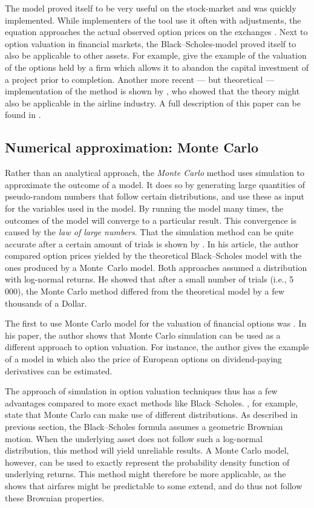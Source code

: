 The model proved itself to be very useful on the stock-market and was quickly implemented. While implementers of the tool use it often with adjustments, the equation approaches the actual observed option prices on the exchanges \cite{bodie2008investments}. 
Next to option valuation in financial markets, the Black--Scholes-model proved itself to also be applicable to other assets. For example,  give the example of the valuation of the options held by a firm which allows it to abandon the capital investment of a project prior to completion. Another more recent --- but theoretical --- implementation of the method is shown by , who showed that the theory might also be applicable in the airline industry. A full description of this paper can be found in .


\subsection{Numerical approximation: Monte Carlo}
Rather than an analytical approach, the \emph{Monte Carlo} method uses simulation to approximate the outcome of a model. It does so by generating large quantities of pseudo-random numbers that follow certain distributions, and use these as input for the variables used in the model.  By running the model many times, the outcomes of the model will converge to a particular result. This convergence is caused by the \emph{law of large numbers}. That the simulation method can be quite accurate after a certain amount of trials is shown by . In his article, the author compared option prices yielded by the theoretical Black--Scholes model with the ones produced by a Monte~Carlo model. Both approaches assumed a distribution with log-normal returns. He showed that after a small number of trials (i.e., 5\,000), the Monte Carlo method differed from the theoretical model by a few thousands of a Dollar.

The first to use Monte Carlo model for the valuation of financial options was . In his paper, the author shows that Monte Carlo simulation can be used as a different approach to option valuation. For instance, the author gives the example of a model in which also the price of European options on dividend-paying derivatives can be estimated.

The approach of simulation in option valuation techniques thus has a few advantages compared to more exact methods like Black--Scholes. , for example, state that Monte Carlo can make use of different distributions. As described in previous section, the Black--Scholes formula assumes a geometric Brownian motion. When the underlying asset does not follow such a log-normal distribution, this method will yield unreliable results. A Monte Carlo model, however, can be used to exactly represent the probability density function of underlying returns. This method might therefore be more applicable, as the  shows that airfares might be predictable to some extend, and do thus not follow these Brownian properties.

